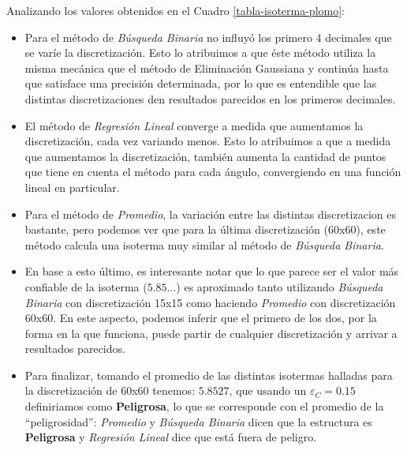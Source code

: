 Analizando los valores obtenidos en el Cuadro \ref{tabla-isoterma-plomo}:
\begin{itemize}
    \item Para el método de \textit{Búsqueda Binaria} no influyó los primero 4 decimales que se varíe la discretización. Esto lo atribuimos a que éste método utiliza la misma mecánica que el método de Eliminación Gaussiana y continúa hasta que satisface una precisión determinada, por lo que es entendible que las distintas discretizaciones den resultados parecidos en los primeros decimales.
    \item El método de \textit{Regresión Lineal} converge a medida que aumentamos la discretización, cada vez variando menos. Esto lo atribuimos a que a medida que aumentamos la discretización, también aumenta la cantidad de puntos que tiene en cuenta el método para cada ángulo, convergiendo en una función lineal en particular.
    \item Para el método de \textit{Promedio}, la variación entre las distintas discretizacion es bastante, pero podemos ver que para la última discretización (60x60), este método calcula una isoterma muy similar al método de \textit{Búsqueda Binaria}.
    \item En base a esto último, es interesante notar que lo que parece ser el valor más confiable de la isoterma ($5.85\dots$) es aproximado tanto utilizando \textit{Búsqueda Binaria} con discretización 15x15 como haciendo \textit{Promedio} con discretización 60x60. En este aspecto, podemos inferir que el primero de los dos, por la forma en la que funciona, puede partir de cualquier discretización y arrivar a resultados parecidos.
    \item Para finalizar, tomando el promedio de las distintas isotermas halladas para la discretización de 60x60 tenemos: $5.8527$, que usando un $\varepsilon_C = 0.15$ definiriamos como \textbf{Peligrosa}, lo que se corresponde con el promedio de la ``peligrosidad'': \textit{Promedio} y \textit{Búsqueda Binaria} dicen que la estructura es \textbf{Peligrosa} y \textit{Regresión Lineal} dice que está fuera de peligro.
\end{itemize}

